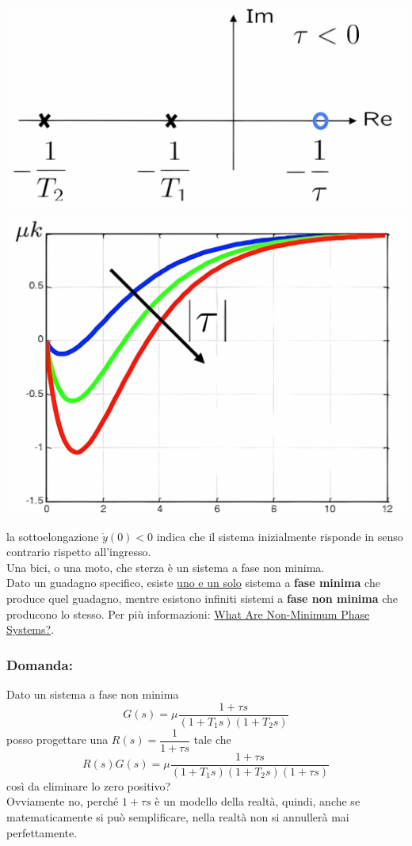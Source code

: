 \documentclass{article}
\numberwithin{equation}{subsection}
\begin{document}
\begin{center}
    \includegraphics[scale=0.16]{Images/Poli_reali_zero_1.png}
    \includegraphics[scale=0.16]{Images/Poli_reali_zero_2.png}
\end{center}
la sottoelongazione $\dot y(0)<0$ indica che il sistema inizialmente risponde in senso contrario rispetto all'ingresso.
\vspace*{0.1cm}\\
Una bici, o una moto, che sterza è un sistema a fase non minima.
\vspace*{0.1cm}\\ 
Dato un guadagno specifico, esiste \underline{uno e un solo} sistema a \textbf{fase minima} che produce quel guadagno, mentre esistono infiniti sistemi a \textbf{fase non minima} che producono lo stesso. Per più informazioni: \href{https://youtu.be/jGEkmDRsq_M}{What Are Non-Minimum Phase Systems?}.

\subsubsection*{Domanda:}
Dato un sistema a fase non minima
\[
    G(s) = \mu\frac{1 + \tau s}{(1+T_1 s)(1+T_2 s)} \tag*{$\tau < 0$}
\]  
posso progettare una $R(s) = \dfrac{1}{1+ \tau s}$ tale che
\[
    R(s) G(s) = \mu \frac{1+ \tau s}{(1+T_1 s)(1+T_2 s)(1+ \tau s)}
\]  
così da eliminare lo zero positivo?\\
Ovviamente no, perché $1+ \tau s$ è un  modello della realtà, quindi, anche se matematicamente si può semplificare, nella realtà non si annullerà mai perfettamente. 
\end{document}
